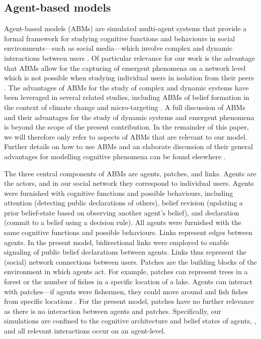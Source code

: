 \documentclass[fleqn,10pt]{wlscirep}
\begin{document}
\subsection*{Agent-based models}
Agent-based models (ABMs) are simulated multi-agent systems that provide a formal framework for studying cognitive functions and behaviours in social environments---such as social media---which involve complex and dynamic interactions between users \cite{wilensky2015introduction}. Of particular relevance for our work is the advantage that ABMs allow for the capturing of emergent phenomena on a network level which is not possible when studying individual users in isolation from their peers  \cite{madsen2019analytic}. The advantages of ABMs for the study of complex and dynamic systems have been leveraged in several related studies, including ABMs of belief formation in the context of climate change \cite{lewandowsky2019influence} and micro-targeting \cite{madsen2018method}. A full discussion of ABMs and their advantages for the study of dynamic systems and emergent phenomena is beyond the scope of the present contribution. In the remainder of this paper, we will therefore only refer to aspects of ABMs that are relevant to our model. Further details on how to use ABMs and an elaborate discussion of their general advantages for modelling cognitive phenomena can be found elsewhere \cite{macal2005tutorial, madsen2019analytic}.

The three central components of ABMs are agents, patches, and links. Agents are the actors, and in our social network they correspond to individual users. Agents were furnished with cognitive functions and possible behaviours, including attention (detecting public declarations of others), belief revision (updating a prior belief-state based on observing another agent’s belief), and declaration (commit to a belief using a decision rule). All agents were furnished with the same cognitive functions and possible behaviours. Links represent edges between agents. In the present model, bidirectional links were employed to enable signaling of public belief declarations between agents. Links thus represent the (social) network connections between users. Patches are the building blocks of the environment in which agents act. For example, patches can represent trees in a forest or the number of fishes in a specific location of a lake. Agents can interact with patches---if agents were fishermen, they could move around and fish fishes from specific locations \cite{bailey2018computational}. For the present model, patches have no further relevance as there is no interaction between agents and patches. Specifically, our simulations are confined to the cognitive architecture and belief states of agents, , and all relevant interactions occur on an agent-level.
\end{document}
